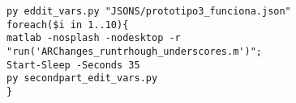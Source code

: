 \vspace{5pt}
\FloatBarrier
\begin{verbatim}
py eddit_vars.py "JSONS/prototipo3_funciona.json"
foreach($i in 1..10){
matlab -nosplash -nodesktop -r "run('ARChanges_runtrhough_underscores.m')";
Start-Sleep -Seconds 35
py secondpart_edit_vars.py
}
\end{verbatim}